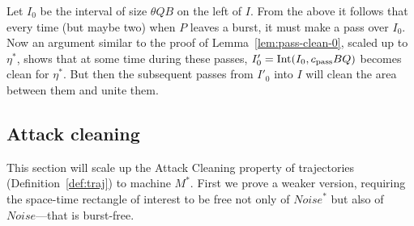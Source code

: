 \documentclass[11pt]{memoir}
\theoremstyle{definition} %
\def\B{B}
\newcommand{\Int}{\mathrm{Int}}
\newcommand{\Noise}{\mathit{Noise}}
\newcommand{\Q}{Q}
\newcommand{\cns}[1]{c_{\textrm{\upshape #1}}}
\newcommand{\CPass}{\cns{pass}}
\begin{document}
\begin{Proof}
  Let \( I_{0} \) be the interval of size \( \theta\Q\B \) on the left of \( I \).
  From the above it follows that
  every time (but maybe two) when \( P \) leaves a burst, it must make a pass over \( I_{0} \).
  Now an argument similar to the proof of Lemma~\ref{lem:pass-clean-0}, scaled up to \( \eta^{*} \),
  shows that at some time during these passes, \( I'_{0}=\Int(I_{0},\CPass\B\Q) \) becomes
  clean for \( \eta^{*} \).
  But then the subsequent passes from \( I'_{0} \) into \( I \) will clean the area
  between them and unite them.  
\end{Proof}

\subsection{Attack cleaning}

This section will scale up the Attack Cleaning property of trajectories (Definition~\ref{def:traj})
to machine \( M^{*} \).
First we prove a weaker version, requiring the space-time rectangle of interest to be free
not only of \( \Noise^{*} \) but also of \( \Noise \)---that is burst-free.
\end{document}
